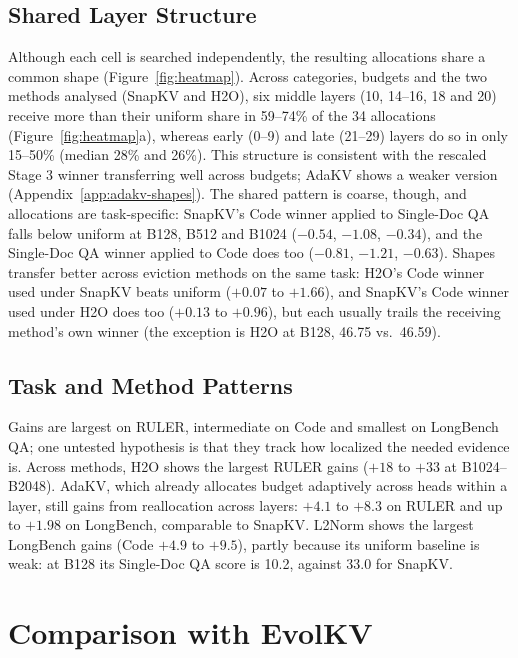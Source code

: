 \documentclass[11pt]{article}
\begin{document}
\subsection{Shared Layer Structure}
\label{sec:shared}

Although each cell is searched independently, the resulting allocations share a common shape (Figure~\ref{fig:heatmap}). Across categories, budgets and the two methods analysed (SnapKV and H2O), six middle layers (10, 14--16, 18 and 20) receive more than their uniform share in 59--74\% of the 34 allocations (Figure~\ref{fig:heatmap}a), whereas early (0--9) and late (21--29) layers do so in only 15--50\% (median 28\% and 26\%). This structure is consistent with the rescaled Stage 3 winner transferring well across budgets; AdaKV shows a weaker version (Appendix~\ref{app:adakv-shapes}). The shared pattern is coarse, though, and allocations are task-specific: SnapKV's Code winner applied to Single-Doc QA falls below uniform at B128, B512 and B1024 ($-0.54$, $-1.08$, $-0.34$), and the Single-Doc QA winner applied to Code does too ($-0.81$, $-1.21$, $-0.63$). Shapes transfer better across eviction methods on the same task: H2O's Code winner used under SnapKV beats uniform ($+0.07$ to $+1.66$), and SnapKV's Code winner used under H2O does too ($+0.13$ to $+0.96$), but each usually trails the receiving method's own winner (the exception is H2O at B128, 46.75 vs.\ 46.59).

\subsection{Task and Method Patterns}

Gains are largest on RULER, intermediate on Code and smallest on LongBench QA; one untested hypothesis is that they track how localized the needed evidence is. Across methods, H2O shows the largest RULER gains ($+18$ to $+33$ at B1024--B2048). AdaKV, which already allocates budget adaptively across heads within a layer, still gains from reallocation across layers: $+4.1$ to $+8.3$ on RULER and up to $+1.98$ on LongBench, comparable to SnapKV. L2Norm shows the largest LongBench gains (Code $+4.9$ to $+9.5$), partly because its uniform baseline is weak: at B128 its Single-Doc QA score is 10.2, against 33.0 for SnapKV.

\section{Comparison with EvolKV}
\label{sec:evolkv}
\end{document}
